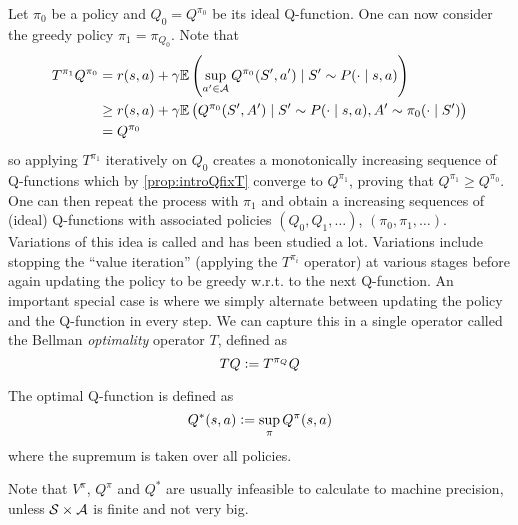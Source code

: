 Let $\pi_0$ be a policy and $Q_0 = Q^{\pi_0}$ be its ideal Q-function.
One can now consider the greedy policy $\pi_1 = \pi_{Q_0}$.
Note that
\begin{align}
  T^{\pi_1} Q^{\pi_0} = & \; r(s, a) + \gamma \mathbb{E} \left(
    \sup_{a' \in \mathcal{A}} Q^{\pi_0}(S', a') \mid S' \sim P(\cdot \mid s, a) 
  \right)
  \\ \geq & \; r(s, a) + \gamma \mathbb{E} \left(
    Q^{\pi_0}(S', A') \mid S' \sim P(\cdot \mid s, a), A' \sim \pi_0(\cdot \mid S')
  \right)
  \\ = & \; Q^{\pi_0} \label{eq:introTlem1}
\end{align}
so applying $T^{\pi_1}$ iteratively on $Q_0$ creates a 
monotonically increasing sequence of Q-functions
which by \cref{prop:introQfixT} converge to $Q^{\pi_1}$,
proving that $Q^{\pi_1} \geq Q^{\pi_0}$.
One can then repeat the process with $\pi_1$ and
obtain a increasing sequences of (ideal) Q-functions with associated policies
$(Q_0,Q_1, \dots)$, $(\pi_0, \pi_1, \dots)$.
Variations of this idea is called 
and has been studied a lot.
Variations include stopping the ``value iteration''
(applying the $T^{\pi_i}$ operator) at various stages before again updating
the policy to be greedy w.r.t. to the next Q-function.
An important special case is where we simply alternate between updating
the policy and the Q-function in every step.
We can capture this in a single operator called the
Bellman \emph{optimality} operator $T$, defined as
\[ T Q \vcentcolon= T^{\pi_Q} Q \]

The optimal Q-function is defined as
\[ Q^*(s, a) \vcentcolon= \sup_\pi Q^\pi(s, a) \]
where the supremum is taken over all policies.



Note that $V^\pi$, $Q^\pi$ and $Q^*$ are usually infeasible to calculate to
machine precision, unless $\mathcal{S} \times \mathcal{A}$ is finite and not very big.

